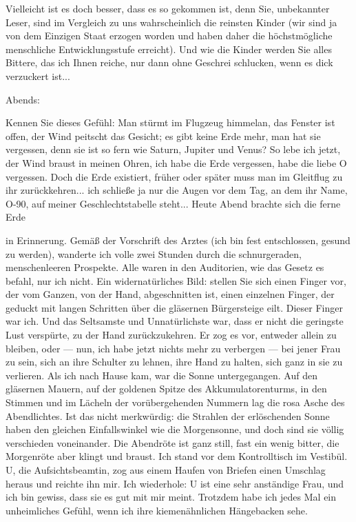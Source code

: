 Vielleicht ist es doch besser, dass es so gekommen ist, denn Sie,
unbekannter Leser, sind im Vergleich zu uns wahrscheinlich die
reinsten Kinder (wir sind ja von dem Einzigen Staat erzogen worden
und haben daher die höchstmögliche menschliche Entwicklungsstufe
erreicht). Und wie die Kinder werden Sie alles Bittere, das ich
Ihnen reiche, nur dann ohne Geschrei schlucken, wenn es dick
verzuckert ist...

Abends:

Kennen Sie dieses Gefühl: Man stürmt im Flugzeug himmelan, das
Fenster ist offen, der Wind peitscht das Gesicht; es gibt keine
Erde mehr, man hat sie vergessen, denn sie ist so fern wie Saturn,
Jupiter und Venus? So lebe ich jetzt, der Wind braust in meinen
Ohren, ich habe die Erde vergessen, habe die liebe O vergessen.
Doch die Erde existiert, früher oder später muss man im Gleitflug
zu ihr zurückkehren... ich schließe ja nur die Augen vor dem Tag,
an dem ihr Name, O-90, auf meiner Geschlechtstabelle steht... Heute
Abend brachte sich die ferne Erde

in Erinnerung. Gemäß der Vorschrift des Arztes (ich bin fest
entschlossen, gesund zu werden), wanderte ich volle zwei Stunden
durch die schnurgeraden, menschenleeren Prospekte. Alle waren in
den Auditorien, wie das Gesetz es befahl, nur ich nicht. Ein
widernatürliches Bild: stellen Sie sich einen Finger vor, der vom
Ganzen, von der Hand, abgeschnitten ist, einen einzelnen Finger,
der geduckt mit langen Schritten über die gläsernen Bürgersteige
eilt. Dieser Finger war ich. Und das Seltsamste und Unnatürlichste
war, dass er nicht die geringste Lust verspürte, zu der Hand
zurückzukehren. Er zog es vor, entweder allein zu bleiben, oder —
nun, ich habe jetzt nichts mehr zu verbergen — bei jener Frau zu
sein, sich an ihre Schulter zu lehnen, ihre Hand zu halten, sich
ganz in sie zu verlieren. Als ich nach Hause kam, war die Sonne
untergegangen. Auf den gläsernen Mauern, auf der goldenen Spitze
des Akkumulatorenturms, in den Stimmen und im Lächeln der
vorübergehenden Nummern lag die rosa Asche des Abendlichtes. Ist
das nicht merkwürdig: die Strahlen der erlöschenden Sonne haben den
gleichen Einfallswinkel wie die Morgensonne, und doch sind sie
völlig verschieden voneinander. Die Abendröte ist ganz still, fast
ein wenig bitter, die Morgenröte aber klingt und braust. Ich stand
vor dem Kontrolltisch im Vestibül. U, die Aufsichtsbeamtin, zog aus
einem Haufen von Briefen einen Umschlag heraus und reichte ihn mir.
Ich wiederhole: U ist eine sehr anständige Frau, und ich bin
gewiss, dass sie es gut mit mir meint. Trotzdem habe ich jedes Mal
ein unheimliches Gefühl, wenn ich ihre kiemenähnlichen Hängebacken
sehe.

